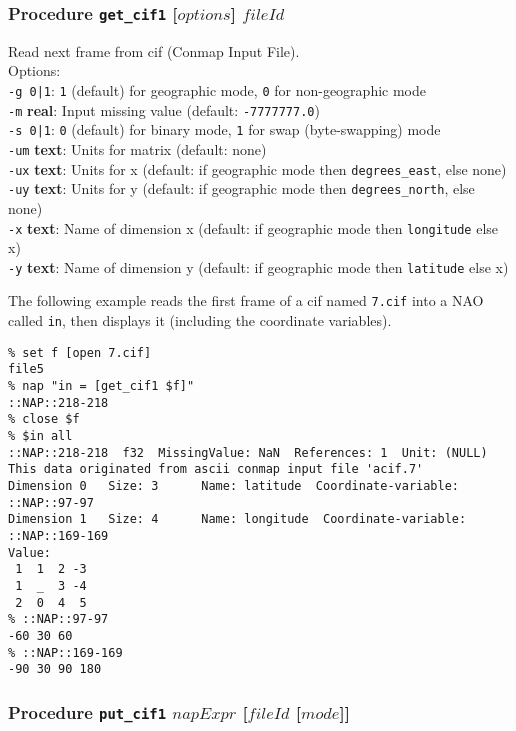 \subsubsection{Procedure
\texttt{get\_cif1} [$\mathit{options}$] $\mathit{fileId}$}
    \label{bin-io-get-cif1}

  Read next frame from cif (Conmap Input File).
  \\Options:
  \\
  \texttt{-g 0|1}: 
  \texttt{1} (default) for geographic mode, 
  \texttt{0} for non-geographic mode
  \\
  \texttt{-m} 
  \textbf{real}: Input missing value (default: 
  \texttt{-7777777.0})
  \\
  \texttt{-s 0|1}: 
  \texttt{0} (default) for binary mode, 
  \texttt{1} for swap (byte-swapping) mode
  \\
  \texttt{-um} 
  \textbf{text}: Units for matrix (default: none)
  \\
  \texttt{-ux} 
  \textbf{text}: Units for x (default: if geographic mode then 
  \texttt{degrees\_east}, else none)
  \\
  \texttt{-uy} 
  \textbf{text}: Units for y (default: if geographic mode then 
  \texttt{degrees\_north}, else none)
  \\
  \texttt{-x} 
  \textbf{text}: Name of dimension x (default: if geographic mode then 
  \texttt{longitude} else x)
  \\
  \texttt{-y} 
  \textbf{text}: Name of dimension y (default: if geographic mode then 
  \texttt{latitude} else x)
  

The following example reads the first frame of a cif named 
  \texttt{7.cif} into a NAO called 
  \texttt{in}, then displays it (including the coordinate
  variables).
  \begin{verbatim}
% set f [open 7.cif]
file5
% nap "in = [get_cif1 $f]"
::NAP::218-218
% close $f
% $in all
::NAP::218-218  f32  MissingValue: NaN  References: 1  Unit: (NULL)
This data originated from ascii conmap input file 'acif.7'
Dimension 0   Size: 3      Name: latitude  Coordinate-variable: ::NAP::97-97
Dimension 1   Size: 4      Name: longitude  Coordinate-variable: ::NAP::169-169
Value:
 1  1  2 -3
 1  _  3 -4
 2  0  4  5
% ::NAP::97-97
-60 30 60
% ::NAP::169-169
-90 30 90 180
\end{verbatim}

\subsubsection{Procedure \texttt{put\_cif1} $napExpr$ [$\mathit{fileId}$ [$\mathit{mode}$]]}
    \label{bin-io-put-cif1}

